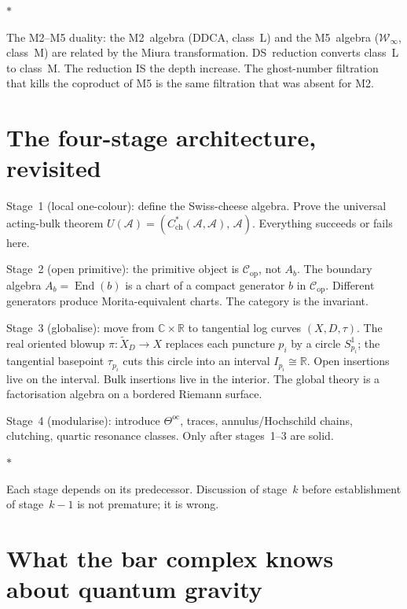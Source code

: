 \documentclass[11pt]{article}
\newcommand{\cA}{\mathcal{A}}
\newcommand{\cC}{\mathcal{C}}
\newcommand{\cW}{\mathcal{W}}
\newcommand{\C}{\mathbb{C}}
\newcommand{\R}{\mathbb{R}}
\newcommand{\End}{\operatorname{End}}
\newcommand{\sep}{\bigskip\begin{center}$*$\end{center}\medskip}
\begin{document}
\sep

The M2--M5 duality: the M2~algebra (DDCA, class~L) and the
M5~algebra ($\cW_\infty$, class~M) are related by the Miura
transformation.  DS~reduction converts class~L to class~M.
The reduction IS the depth increase.  The ghost-number filtration
that kills the coproduct of M5 is the same filtration that was
absent for M2.


\section{The four-stage architecture, revisited}
\label{sec:four-stages-revisited}

Stage~1 (local one-colour): define the Swiss-cheese algebra.
Prove the universal acting-bulk theorem
$U(\cA) = (C^*_{\mathrm{ch}}(\cA,\cA),\, \cA)$.
Everything succeeds or fails here.

\medskip

Stage~2 (open primitive): the primitive object is
$\cC_{\mathrm{op}}$, not $A_b$.  The boundary algebra
$A_b = \End(b)$ is a chart of a compact generator $b$ in
$\cC_{\mathrm{op}}$.  Different generators produce
Morita-equivalent charts.  The category is the invariant.

\medskip

Stage~3 (globalise): move from $\C \times \R$ to tangential log
curves $(X, D, \tau)$.  The real oriented blowup
$\pi\colon \widetilde{X}_D \to X$ replaces each puncture $p_i$ by
a circle $S^1_{p_i}$; the tangential basepoint $\tau_{p_i}$ cuts
this circle into an interval $I_{p_i} \cong \R$.  Open insertions
live on the interval.  Bulk insertions live in the interior.  The
global theory is a factorisation algebra on a bordered Riemann
surface.

\medskip

Stage~4 (modularise): introduce $\Theta^{\mathrm{oc}}$, traces,
annulus/Hochschild chains, clutching, quartic resonance classes.
Only after stages~1--3 are solid.

\sep

Each stage depends on its predecessor.  Discussion of stage~$k$
before establishment of stage~$k-1$ is not premature; it is wrong.


\section{What the bar complex knows about quantum gravity}
\label{sec:bar-knows-gravity}
\end{document}
